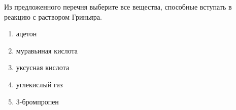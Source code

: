 Из предложенного перечня выберите все вещества, способные вступать в реакцию с раствором Гриньяра.

\begin{enumerate}
    \item ацетон
    \item муравьиная кислота
    \item уксусная кислота
    \item углекислый газ
    \item 3-бромпропен
    \end{enumerate}

